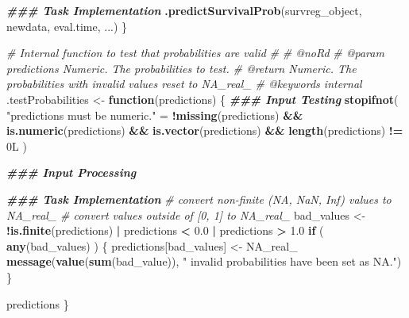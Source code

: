 \documentclass[
]{book}
\newenvironment{Shaded}{\begin{snugshade}}{\end{snugshade}}
\newcommand{\CommentTok}[1]{\textcolor[rgb]{0.56,0.35,0.01}{\textit{#1}}}
\newcommand{\ConstantTok}[1]{\textcolor[rgb]{0.56,0.35,0.01}{#1}}
\newcommand{\ControlFlowTok}[1]{\textcolor[rgb]{0.13,0.29,0.53}{\textbf{#1}}}
\newcommand{\DocumentationTok}[1]{\textcolor[rgb]{0.56,0.35,0.01}{\textbf{\textit{#1}}}}
\newcommand{\FloatTok}[1]{\textcolor[rgb]{0.00,0.00,0.81}{#1}}
\newcommand{\FunctionTok}[1]{\textcolor[rgb]{0.13,0.29,0.53}{\textbf{#1}}}
\newcommand{\NormalTok}[1]{#1}
\newcommand{\OtherTok}[1]{\textcolor[rgb]{0.56,0.35,0.01}{#1}}
\newcommand{\SpecialCharTok}[1]{\textcolor[rgb]{0.81,0.36,0.00}{\textbf{#1}}}
\newcommand{\StringTok}[1]{\textcolor[rgb]{0.31,0.60,0.02}{#1}}
\begin{document}
\begin{Shaded}
\begin{Highlighting}[]
  \DocumentationTok{\#\#\# Task Implementation}
  \FunctionTok{.predictSurvivalProb}\NormalTok{(survreg\_object, newdata, eval.time, ...)}
\NormalTok{\}}

\CommentTok{\#\textquotesingle{} Internal function to test that probabilities are valid}
\CommentTok{\#\textquotesingle{} }
\CommentTok{\#\textquotesingle{} @noRd}
\CommentTok{\#\textquotesingle{} @param predictions Numeric. The probabilities to test.}
\CommentTok{\#\textquotesingle{} @return Numeric. The probabilities with invalid values reset to NA\_real\_}
\CommentTok{\#\textquotesingle{} @keywords internal}
\NormalTok{.testProbabilities }\OtherTok{\textless{}{-}} \ControlFlowTok{function}\NormalTok{(predictions) \{}
  \DocumentationTok{\#\#\# Input Testing}
  \FunctionTok{stopifnot}\NormalTok{(}
    \StringTok{"\textasciigrave{}predictions\textasciigrave{} must be numeric."} \OtherTok{=} 
      \SpecialCharTok{!}\FunctionTok{missing}\NormalTok{(predictions) }\SpecialCharTok{\&\&} \FunctionTok{is.numeric}\NormalTok{(predictions) }\SpecialCharTok{\&\&} 
      \FunctionTok{is.vector}\NormalTok{(predictions) }\SpecialCharTok{\&\&} \FunctionTok{length}\NormalTok{(predictions) }\SpecialCharTok{!=}\NormalTok{ 0L}
\NormalTok{  )}
  
  \DocumentationTok{\#\#\# Input Processing}
  
  \DocumentationTok{\#\#\# Task Implementation}
  \CommentTok{\# convert non{-}finite (NA, NaN, Inf) values to NA\_real\_}
  \CommentTok{\# convert values outside of [0, 1] to NA\_real\_}
\NormalTok{  bad\_values }\OtherTok{\textless{}{-}} \SpecialCharTok{!}\FunctionTok{is.finite}\NormalTok{(predictions) }\SpecialCharTok{|}\NormalTok{ predictions }\SpecialCharTok{\textless{}} \FloatTok{0.0} \SpecialCharTok{|}\NormalTok{ predictions }\SpecialCharTok{\textgreater{}} \FloatTok{1.0}
  \ControlFlowTok{if}\NormalTok{ ( }\FunctionTok{any}\NormalTok{(bad\_values) ) \{}
\NormalTok{    predictions[bad\_values] }\OtherTok{\textless{}{-}} \ConstantTok{NA\_real\_}
    \FunctionTok{message}\NormalTok{(}\FunctionTok{value}\NormalTok{(}\FunctionTok{sum}\NormalTok{(bad\_value)), }\StringTok{" invalid probabilities have been set as NA."}\NormalTok{)}
\NormalTok{  \}}
  
\NormalTok{  predictions}
\NormalTok{\}}


\end{Highlighting}
\end{Shaded}
\end{document}
